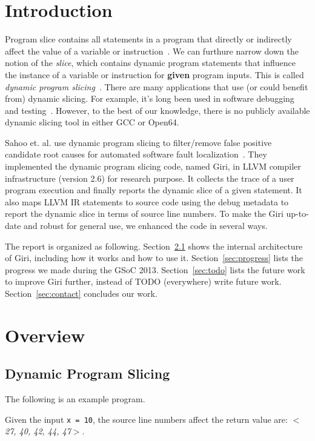 \documentclass[DIV=calc, paper=a4, fontsize=11pt, twocolumn]{scrartcl}
\begin{document}
\section{Introduction}
Program slice contains all statements in a program that directly or indirectly affect the value of a variable or instruction~\cite{weiser}.
We can furthure narrow down the notion of the \emph{slice},
which contains dynamic program statements that influence the instance of a variable or instruction for \textbf{given} program inputs.
This is called \emph{dynamic program slicing}~\cite{agrawal1990dynamic}.
There are many applications that use (or could benefit from) dynamic slicing.
For example, it's long been used in software debugging~\cite{1993debugging,1999efficient} and testing~\cite{1993incremental}.
However, to the best of our knowledge, there is no publicly available dynamic slicing tool in either GCC or Open64.

Sahoo et. al. use dynamic program slicing to filter/remove false positive candidate root causes for automated software fault localization~\cite{sahoo2013asplos}.
They implemented the dynamic program slicing code, named Giri, in LLVM compiler infrastructure (version 2.6) for research purpose.
It collects the trace of a user program execution and finally reports the dynamic slice of a given statement.
It also maps LLVM IR statements to source code using the debug metadata to report the dynamic slice in terms of source line numbers.
To make the Giri up-to-date and robust for general use, we enhanced the code in several ways.

The report is organized as following.
Section~\ref{sec:overview} shows the internal architecture of Giri, including how it works and how to use it.
Section~\ref{sec:progress} lists the progress we made during the GSoC 2013.
Section~\ref{sec:todo} lists the future work to improve Giri further, instead of TODO (everywhere) write future work.
Section~\ref{sec:contact} concludes our work.

\section{Overview}
\subsection{Dynamic Program Slicing}
\label{sec:overview}
The following is an example program.

Given the input \texttt{x = 10}, the source line numbers affect the return value are: $<$\emph{27, 40, 42, 44, 47}$>$.
\end{document}

